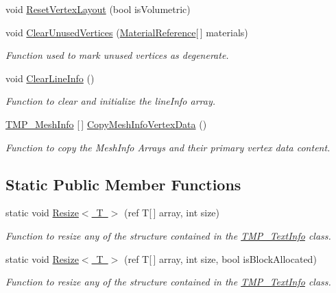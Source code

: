 \begin{DoxyCompactItemize}
void \mbox{\hyperlink{class_t_m_pro_1_1_t_m_p___text_info_a62fb378fdbe5f9cce0ac975968e4fe21}{Reset\+Vertex\+Layout}} (bool is\+Volumetric)
\item 
void \mbox{\hyperlink{class_t_m_pro_1_1_t_m_p___text_info_a7f60ff4e9617668074499ef69eeb9c65}{Clear\+Unused\+Vertices}} (\mbox{\hyperlink{struct_t_m_pro_1_1_material_reference}{Material\+Reference}}\mbox{[}$\,$\mbox{]} materials)
\begin{DoxyCompactList}\small\item\em Function used to mark unused vertices as degenerate. \end{DoxyCompactList}\item 
void \mbox{\hyperlink{class_t_m_pro_1_1_t_m_p___text_info_a8681083e478f949f5ba57d1b2f59f9bf}{Clear\+Line\+Info}} ()
\begin{DoxyCompactList}\small\item\em Function to clear and initialize the line\+Info array. \end{DoxyCompactList}\item 
\mbox{\hyperlink{struct_t_m_pro_1_1_t_m_p___mesh_info}{T\+M\+P\+\_\+\+Mesh\+Info}} \mbox{[}$\,$\mbox{]} \mbox{\hyperlink{class_t_m_pro_1_1_t_m_p___text_info_a665aff73b3e4eceb0198f198ae831a81}{Copy\+Mesh\+Info\+Vertex\+Data}} ()
\begin{DoxyCompactList}\small\item\em Function to copy the Mesh\+Info Arrays and their primary vertex data content. \end{DoxyCompactList}\end{DoxyCompactItemize}
\subsection*{Static Public Member Functions}
\begin{DoxyCompactItemize}
\item 
static void \mbox{\hyperlink{class_t_m_pro_1_1_t_m_p___text_info_a3d0a1c4a3f618976099dbaa0473395ff}{Resize$<$ T $>$}} (ref T\mbox{[}$\,$\mbox{]} array, int size)
\begin{DoxyCompactList}\small\item\em Function to resize any of the structure contained in the \mbox{\hyperlink{class_t_m_pro_1_1_t_m_p___text_info}{T\+M\+P\+\_\+\+Text\+Info}} class. \end{DoxyCompactList}\item 
static void \mbox{\hyperlink{class_t_m_pro_1_1_t_m_p___text_info_aef15865763027788edc0ed4eceb57d1c}{Resize$<$ T $>$}} (ref T\mbox{[}$\,$\mbox{]} array, int size, bool is\+Block\+Allocated)
\begin{DoxyCompactList}\small\item\em Function to resize any of the structure contained in the \mbox{\hyperlink{class_t_m_pro_1_1_t_m_p___text_info}{T\+M\+P\+\_\+\+Text\+Info}} class. \end{DoxyCompactList}\end{DoxyCompactItemize}
